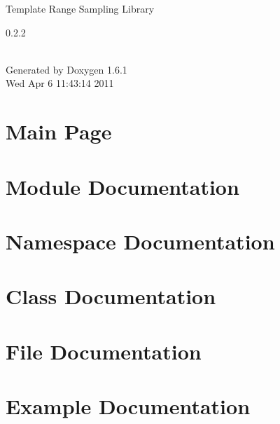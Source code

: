 \documentclass[a4paper]{article}
\begin{document}
\hypersetup{pageanchor=false}
\begin{titlepage}
\vspace*{7cm}
\begin{center}
{\Large Template Range Sampling Library \\[1ex]\large \begin{center}0.2.2\end{center}  }\\
\vspace*{1cm}
{\large Generated by Doxygen 1.6.1}\\
\vspace*{0.5cm}
{\small Wed Apr 6 11:43:14 2011}\\
\end{center}
\end{titlepage}
\tableofcontents
{}
\hypersetup{pageanchor=true}
\section{Main Page}
\label{index}\hypertarget{index}{}
\section{Module Documentation}







\section{Namespace Documentation}



\section{Class Documentation}













\section{File Documentation}









\section{Example Documentation}





\printindex
\end{document}

